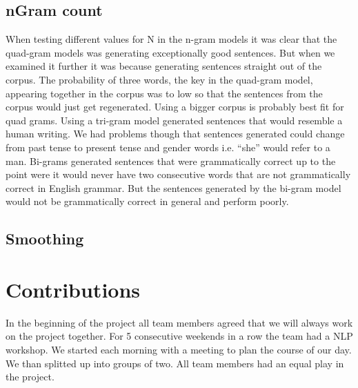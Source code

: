 \documentclass[a4paper,12pt]{article}
\begin{document}
\subsection{nGram count}
When testing different values for N in the n-gram models it was clear that the quad-gram models was generating exceptionally good sentences. But when we examined it further it was because generating sentences straight out of the corpus. The probability of three words, the key in the quad-gram model, appearing together in the corpus was to low so that the sentences from the corpus would just get regenerated. Using a bigger corpus is probably best fit for quad grams. Using a tri-gram model generated sentences that would resemble a human writing. We had problems though that sentences generated could change from past tense to present tense and gender words  i.e. ``she'' would refer to a man. Bi-grams generated sentences that were grammatically correct up to the point were it would never have two consecutive words that are not grammatically correct in English grammar. But the sentences generated by the bi-gram model would not be grammatically correct in general and perform poorly.


\subsection{Smoothing}





\section{Contributions}
\label{sec:contributions}
In the beginning of the project all team members agreed that we will always work on the project together. For 5 consecutive weekends in a row the team had a NLP workshop. We started each morning with a meeting to plan  the course of our day. We than splitted up into groups of two. All team members had an equal play in the project. 

\clearpage


\end{document}
